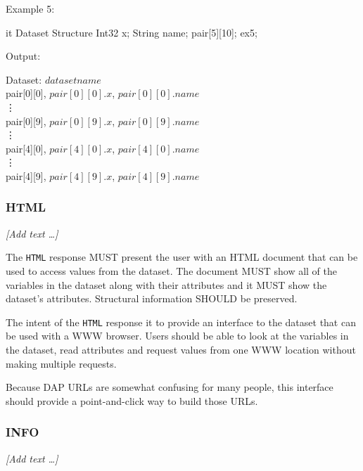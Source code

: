 \documentclass{article}
\begin{document}
\begin{enumerate}
\T\begin{minipage}{5in}
Example 5:
\T\medskip

\begin{vcode}{it}
Dataset {
    Structure {
        Int32 x;
        String name;
    } pair[5][10];
} ex5;
\end{vcode}
\T\medskip

Output:\\
\begin{ttfamily}
Dataset: $dataset name$\\
pair[0][0], $pair[0][0].x$, $pair[0][0].name$\\
\vdots\\
pair[0][9], $pair[0][9].x$, $pair[0][9].name$\\
\vdots\\
pair[4][0], $pair[4][0].x$, $pair[4][0].name$\\
\vdots\\
pair[4][9], $pair[4][9].x$, $pair[4][9].name$\\
\end{ttfamily}
\T\end{minipage}
\T\bigskip

\end{enumerate}

\subsubsection{HTML}
\label{sec:html}
\emph{[Add text \ldots]}

The \texttt{HTML} response MUST present the user with an \ac{HTML} document
that can be used to access values from the dataset. The document MUST show
all of the variables in the dataset along with their attributes and it MUST
show the dataset's attributes. Structural information SHOULD be preserved. 

The intent of the \texttt{HTML} response it to provide an interface to the
dataset that can be used with a \ac{WWW} browser. Users should be able to
look at the variables in the dataset, read attributes and request values from
one \ac{WWW} location without making multiple requests. 

Because \ac{DAP} \ac{URL}s are somewhat confusing for many people, this
interface should provide a point-and-click way to build those \ac{URL}s.

\subsubsection{INFO}
\label{sec:info}
\emph{[Add text \ldots]}
\end{document}
